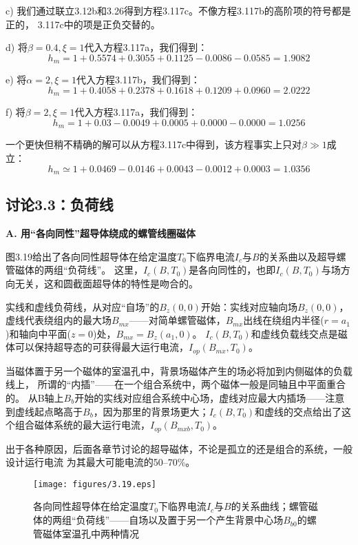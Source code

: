 c) 我们通过联立3.12b和3.26得到方程3.117c。不像方程3.117b的高阶项的符号都是正的，
3.117c中的项是正负交替的。 

d) 将$\beta=0.4,\xi=1$代入方程3.117a，我们得到：
$$h_m=1 + 0.5574 + 0.3055 + 0.1125 − 0.0086 − 0.0585 = 1.9082$$

e) 将$\alpha=2,\xi=1$代入方程3.117b，我们得到：
$$ h_m=1 + 0.4058 + 0.2378 + 0.1618 + 0.1209 + 0.0960 = 2.0222$$

f) 将$\beta=2,\xi=1$代入方程3.117a，我们得到：
$$ h_m=1 + 0.03 − 0.0049 + 0.0005 + 0.0000 − 0.0000 = 1.0256 $$

一个更快但稍不精确的解可以从方程3.117c中得到，该方程事实上只对$\beta\gg 1$成立：
$$h_m \simeq 1 + 0.0469 − 0.0146 + 0.0043 − 0.0012 + 0.0003 = 1.0356$$

\newpage

\subsection{讨论3.3：负荷线}
\textbf{A. 用“各向同性”超导体绕成的螺管线圈磁体}

图3.19给出了各向同性超导体在给定温度$T_0$下临界电流$I_c$与$B$的关系曲以及超导螺管磁体的两组“负荷线”。
这里，$I_c(B,T_0)$是各向同性的，也即$I_c(B,T_0)$与场方向无关，这和圆截面超导体的特性是吻合的。

实线和虚线负荷线，从对应“自场”的$B_z(0,0)$开始：实线对应轴向场$B_z(0,0)$，虚线代表绕组内的最大场$B_{mx}$——对简单螺管磁体，$B_{mx}$出线在绕组内半径($r=a_1$)和轴向中平面($z=0$)处，$B_{mx}=B_z(a_1,0)$。
$I_c(B,T_0)$和虚线负载线交点是磁体可以保持超导态的可获得最大运行电流，$I_{op}(B_{mx},T_0)$。

当磁体置于另一个磁体的室温孔中，背景场磁体产生的场必将加到内侧磁体的负载线上，
所谓的“内插”——在一个组合系统中，两个磁体一般是同轴且中平面重合的。
从B轴上$B_{b}$开始的实线对应组合系统中心场，虚线对应最大内插场——注意到虚线起点略高于$B_{b}$，因为那里的背景场更大；$I_c(B,T_0)$和虚线的交点给出了这个组合磁体系统的最大运行电流，$I_{op}(B_{mxb},T_0)$。

出于各种原因，后面各章节讨论的超导磁体，不论是孤立的还是组合的系统，一般设计运行电流
为其最大可能电流的50–70\%。

\begin{figure}[htbp]
	\centering
	\texttt{[image: figures/3.19.eps]}
	\caption{各向同性超导体在给定温度$T_0$下临界电流$I_c$与$B$的关系曲线；螺管磁体的两组“负荷线”——自场以及置于另一个产生背景中心场$B_{b0}$的螺管磁体室温孔中两种情况}
\end{figure}

